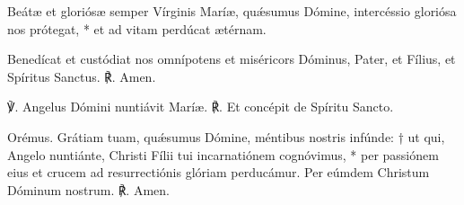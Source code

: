 






\paschaAntiphona




\vfill


\kyrieEleison



\dominusVobiscum


Beátæ et gloriósæ semper Vírginis Maríæ, quǽsumus Dómine,
intercéssio gloriósa nos prótegat, *
et ad vitam perdúcat ætérnam.

\perDominum

\dominusVobiscumRep

\benedicamusDomino


Benedícat et custódiat nos
omnípotens et miséricors Dóminus,
Pater, et Fílius, et Spíritus Sanctus.
℟. Amen.





℣. Angelus Dómini nuntiávit Maríæ.
℟. Et concépit de Spíritu Sancto.

Orémus.
Grátiam tuam, quǽsumus Dómine, méntibus nostris infúnde: †
ut qui, Angelo nuntiánte, Christi Fílii tui incarnatiónem cognóvimus, *
per passiónem eius et crucem ad resurrectiónis glóriam perducámur.
Per eúmdem Christum Dóminum nostrum. 
℟. Amen.


